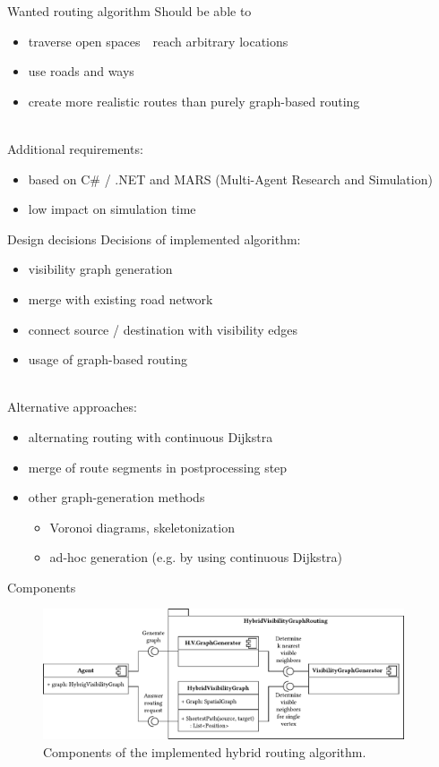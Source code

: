 \documentclass[xcolor={x11names}]{beamer}
\renewcommand{\n}{\hfill\\[0.5ex]}
\newcommand{\nn}{\hfill\\[2ex]}
\newenvironment{figcenter}
{%
	\parskip=0pt%
	\par%
	\nopagebreak%
	\centering%
}%
{%
	\par%
	\noindent%
	\ignorespacesafterend%
}
\begin{document}
		\begin{frame}{Wanted routing algorithm}
			Should be able to\n
			\begin{itemize}
				\item traverse open spaces\ \textrightarrow\ reach arbitrary locations
				\item use roads and ways
				\item create more realistic routes than purely graph-based routing
			\end{itemize}
			\nn
			\pause
			Additional requirements:\n
			\begin{itemize}
				\item based on C\# / .NET and MARS (Multi-Agent Research and Simulation)
				\item low impact on simulation time
			\end{itemize}
		\end{frame}
		
		\begin{frame}{Design decisions}
			Decisions of implemented algorithm:\n
			\begin{itemize}
				\item visibility graph generation
				\item merge with existing road network
				\item connect source / destination with visibility edges
				\item usage of graph-based routing
			\end{itemize}
			\nn
			\pause
			Alternative approaches:\n
			\begin{itemize}
				\item alternating routing with continuous Dijkstra
				\item merge of route segments in postprocessing step
				\item other graph-generation methods
				\begin{itemize}
					\item Voronoi diagrams, skeletonization
					\item ad-hoc generation (e.g. by using continuous Dijkstra)
				\end{itemize}
			\end{itemize}
		\end{frame}
		
		\begin{frame}{Components}
			\begin{figure}[t]
				\begin{figcenter}
					\includegraphics[width=0.95\textwidth]{images/components.pdf}
				\end{figcenter}
				\caption{Components of the implemented hybrid routing algorithm.}
			\end{figure}
		\end{frame}
		
\end{document}
